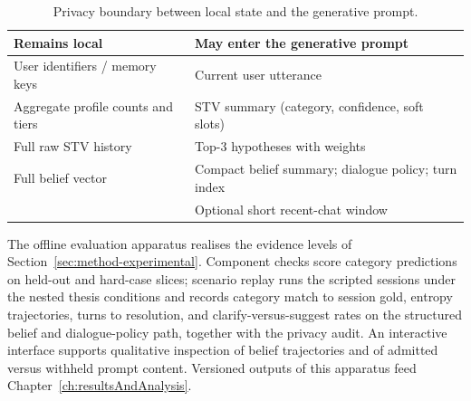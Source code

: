 \begin{table}[!ht]
  \centering
  \small
  \caption{Privacy boundary between local state and the generative prompt.}
  \label{tab:construction-privacy}
  \setlength{\tabcolsep}{4pt}
  \begin{tabular}{@{}p{}p{}@{}}
    \hline
    \textbf{Remains local} & \textbf{May enter the generative prompt} \\
    \hline
    User identifiers / memory keys & Current user utterance \\
    Aggregate profile counts and tiers & STV summary (category, confidence, soft slots) \\
    Full raw STV history & Top-3 hypotheses with weights \\
    Full belief vector & Compact belief summary; dialogue policy; turn index \\
    & Optional short recent-chat window \\
    \hline
  \end{tabular}
\end{table}

The offline evaluation apparatus realises the evidence levels of Section~\ref{sec:method-experimental}.
Component checks score category predictions on held-out and hard-case slices; scenario replay runs the scripted sessions under the nested thesis conditions and records category match to session gold, entropy trajectories, turns to resolution, and clarify-versus-suggest rates on the structured belief and dialogue-policy path, together with the privacy audit.
An interactive interface supports qualitative inspection of belief trajectories and of admitted versus withheld prompt content.
Versioned outputs of this apparatus feed Chapter~\ref{ch:resultsAndAnalysis}.

\cleardoublepage

